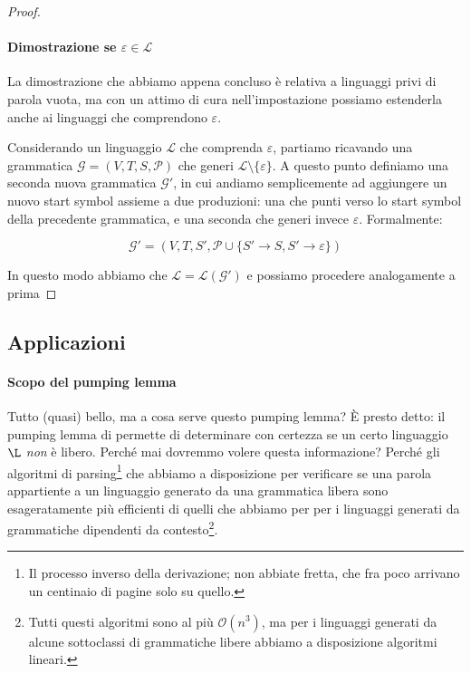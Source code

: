 \documentclass[class=book, crop=false, oneside, 12pt]{standalone}
\begin{document}
\begin{proof}
   \paragraph{Dimostrazione se \(\varepsilon \in \mathcal{L}\)}
   La dimostrazione che abbiamo appena concluso è relativa a linguaggi privi di parola vuota, ma con un attimo di cura nell'impostazione possiamo estenderla anche ai linguaggi che comprendono \(\varepsilon\).

   Considerando un linguaggio \(\mathcal{L}\) che comprenda \(\varepsilon\), partiamo ricavando una grammatica \(\mathcal{G} = (V, T, S, \mathcal{P})\) che generi \(\mathcal{L} \setminus \{\varepsilon\}\). A questo punto definiamo una seconda nuova grammatica \(\mathcal{G}'\), in cui andiamo semplicemente ad aggiungere un nuovo start symbol assieme a due produzioni: una che punti verso lo start symbol della precedente grammatica, e una seconda che generi invece \(\varepsilon\). Formalmente:

   \begin{equation*}
     \mathcal{G}' = (V, T, S', \mathcal{P} \cup \{ S' \rightarrow S, S' \rightarrow \varepsilon \})
   \end{equation*}

   In questo modo abbiamo che \(\mathcal{L} = \mathcal{L(G')}\) e possiamo procedere analogamente a prima

\end{proof}

\subsection{Applicazioni}
  \paragraph{Scopo del pumping lemma}
  Tutto (quasi) bello, ma a cosa serve questo pumping lemma? È presto detto: il pumping lemma di permette di determinare con certezza se un certo linguaggio \(\L\) \emph{non} è libero. Perché mai dovremmo volere questa informazione? Perché gli algoritmi di parsing\footnote{Il processo inverso della derivazione; non abbiate fretta, che fra poco arrivano un centinaio di pagine solo su quello.} che abbiamo a disposizione per verificare se una parola appartiente a un linguaggio generato da una grammatica libera sono esageratamente più efficienti di quelli che abbiamo per per i linguaggi generati da grammatiche dipendenti da contesto\footnote{Tutti questi algoritmi sono al più \(\mathcal{O}(n^3)\), ma per i linguaggi generati da alcune sottoclassi di grammatiche libere abbiamo a disposizione algoritmi lineari.}.
\end{document}

